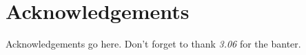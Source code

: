 \cleardoublepage

\chapter*{Acknowledgements}
{}


Acknowledgements go here.
Don't forget to thank \emph{3.06} for the banter.


\cleardoublepage


\renewcommand{\contentsname}{Table of Contents}
\tableofcontents

\listoffigures

\listoftables


\cleardoublepage
